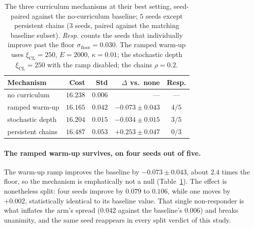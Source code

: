 \documentclass[letterpaper]{article} %
\begin{document}
\begin{table}[t]
\centering
\footnotesize
\setlength{\tabcolsep}{4pt}
\begin{tabular}{lrrrc}
\toprule
\textbf{Mechanism} & \textbf{Cost} & \textbf{Std} & \textbf{$\Delta$ vs.\ none} & \textbf{Resp.} \\
\midrule
no curriculum & $16.238$ & $0.006$ & --- & --- \\
ramped warm-up & $\mathbf{16.165}$ & $0.042$ & $-0.073 \pm 0.043$ & $4/5$ \\
stochastic depth & $16.204$ & $0.015$ & $-0.034 \pm 0.015$ & $3/5$ \\
persistent chains & $16.487$ & $0.053$ & $+0.253 \pm 0.047$ & $0/3$ \\
\bottomrule
\end{tabular}
\caption{The three curriculum mechanisms at their best setting, seed-paired against the no-curriculum baseline; $5$ seeds except persistent chains ($3$ seeds, paired against the matching baseline subset). \emph{Resp.} counts the seeds that individually improve past the floor $\sigma_{\mathrm{floor}} = 0.030$. The ramped warm-up uses $\xi_{\mathrm{CL}} = 250$, $E = 2000$, $\kappa = 0.01$; the stochastic depth $\xi_{\mathrm{CL}} = 250$ with the ramp disabled; the chains $\rho = 0.2$.}
\label{tab:clmech}
\end{table}

\paragraph{The ramped warm-up survives, on four seeds out of five.}
The warm-up ramp improves the baseline by $-0.073 \pm 0.043$, about $2.4$ times the floor, so the mechanism is emphatically not a null (Table~\ref{tab:clmech}). The effect is nonetheless split: four seeds improve by $0.079$ to $0.106$, while one moves by $+0.002$, statistically identical to its baseline value. That single non-responder is what inflates the arm's spread ($0.042$ against the baseline's $0.006$) and breaks unanimity, and the same seed reappears in every split verdict of this study.
\end{document}
